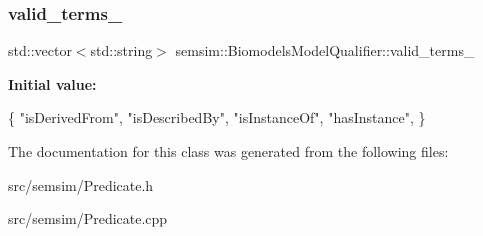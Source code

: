 \subsubsection{\texorpdfstring{valid\+\_\+terms\+\_\+}{valid\_terms\_}}
{\footnotesize\ttfamily std\+::vector$<$std\+::string$>$ semsim\+::\+Biomodels\+Model\+Qualifier\+::valid\+\_\+terms\+\_\+}

{\bfseries Initial value\+:}
\begin{DoxyCode}
\{
                \textcolor{stringliteral}{"isDerivedFrom"},
                \textcolor{stringliteral}{"isDescribedBy"},
                \textcolor{stringliteral}{"isInstanceOf"},
                \textcolor{stringliteral}{"hasInstance"},
        \}
\end{DoxyCode}


The documentation for this class was generated from the following files\+:\begin{DoxyCompactItemize}
\item 
src/semsim/Predicate.\+h\item 
src/semsim/Predicate.\+cpp\end{DoxyCompactItemize}
